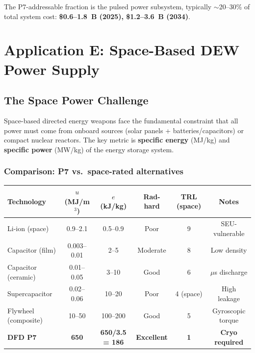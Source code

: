 \documentclass[11pt]{article}
\begin{document}
The P7-addressable fraction is the pulsed power subsystem, typically
$\sim$20--30\% of total system cost: \textbf{\$0.6--1.8~B (2025),
\$1.2--3.6~B (2034)}.

\section{Application E: Space-Based DEW Power Supply}
\label{sec:space-DEW}

\subsection{The Space Power Challenge}

Space-based directed energy weapons face the fundamental constraint that
all power must come from onboard sources (solar panels + batteries/capacitors)
or compact nuclear reactors. The key metric is \textbf{specific energy}
(MJ/kg) and \textbf{specific power} (MW/kg) of the energy storage system.

\subsubsection{Comparison: P7 vs.\ space-rated alternatives}

\begin{center}
\begin{tabular}{lccccc}
\toprule
Technology & $u$ (MJ/m$^3$) & $e$ (kJ/kg) & Rad-hard & TRL (space) & Notes \\
\midrule
Li-ion (space) & 0.9--2.1 & 0.5--0.9 & Poor & 9 & SEU-vulnerable \\
Capacitor (film) & 0.003--0.01 & 2--5 & Moderate & 8 & Low density \\
Capacitor (ceramic) & 0.01--0.05 & 3--10 & Good & 6 & $\mu$s discharge \\
Supercapacitor & 0.02--0.06 & 10--20 & Poor & 4 (space) & High leakage \\
Flywheel (composite) & 10--50 & 100--200 & Good & 5 & Gyroscopic torque \\
\midrule
\textbf{DFD P7} & \textbf{650} & \textbf{650/3.5 = 186} & \textbf{Excellent}
  & \textbf{1} & \textbf{Cryo required} \\
\bottomrule
\end{tabular}
\end{center}
\end{document}
